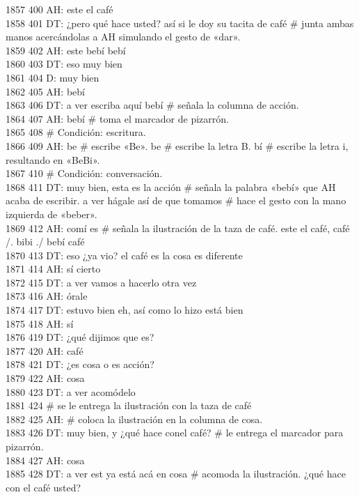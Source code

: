 1857 400 AH: este el café\\
1858 401 DT: ¿pero qué hace usted? así si le doy su tacita de café # junta ambas manos acercándolas a AH simulando el gesto de «dar».\\
1859 402 AH: este bebí bebí\\
1860 403 DT: eso muy bien\\
1861 404 D: muy bien\\
1862 405 AH: bebí\\
1863 406 DT: a ver escriba aquí bebí # señala la columna de acción.\\
1864 407 AH: bebí # toma el marcador de pizarrón.\\
1865 408 # Condición: escritura.\\
1866 409 AH: be # escribe «Be». be # escribe la letra B. bí # escribe la letra i, resultando en «BeBi».\\
1867 410 # Condición: conversación.\\
1868 411 DT: muy bien, esta es la acción # señala la palabra «bebí» que AH acaba de escribir. a ver hágale así de que tomamos # hace el gesto con la mano izquierda de «beber».\\
1869 412 AH: comí es # señala la ilustración de la taza de café. este el café, café /. bibi ./ bebí café\\
1870 413 DT: eso ¿ya vio? el café es la cosa es diferente\\
1871 414 AH: sí cierto\\
1872 415 DT: a ver vamos a hacerlo otra vez\\
1873 416 AH: órale\\
1874 417 DT: estuvo bien eh, así como lo hizo está bien\\
1875 418 AH: sí\\
1876 419 DT: ¿qué dijimos que es?\\
1877 420 AH: café\\
1878 421 DT: ¿es cosa o es acción?\\
1879 422 AH: cosa\\
1880 423 DT: a ver acomódelo\\
1881 424 # se le entrega la ilustración con la taza de café\\
1882 425 AH: # coloca la ilustración en la columna de cosa.\\
1883 426 DT: muy bien, y ¿qué hace conel café? # le entrega el marcador para pizarrón.\\
1884 427 AH: cosa\\
1885 428 DT: a ver est ya está acá en cosa # acomoda la ilustración. ¿qué hace con el café usted?\\
